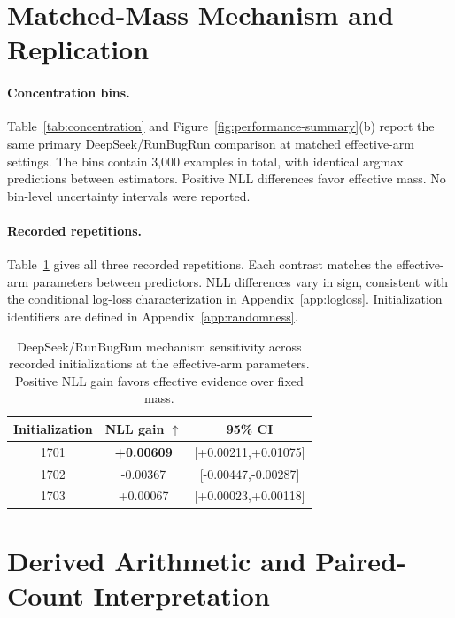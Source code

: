 \documentclass{article}
\begin{document}
\section{Matched-Mass Mechanism and Replication}
\label{app:mechanism-full}

\paragraph{Concentration bins.}
Table~\ref{tab:concentration} and Figure~\ref{fig:performance-summary}(b) report the same primary DeepSeek/RunBugRun comparison at matched effective-arm settings. The bins contain 3,000 examples in total, with identical argmax predictions between estimators. Positive NLL differences favor effective mass. No bin-level uncertainty intervals were reported.

\paragraph{Recorded repetitions.}
Table~\ref{tab:cross-seed-mechanism} gives all three recorded repetitions. Each contrast matches the effective-arm parameters between predictors. NLL differences vary in sign, consistent with the conditional log-loss characterization in Appendix~\ref{app:logloss}. Initialization identifiers are defined in Appendix~\ref{app:randomness}.

\begin{table}[htbp]
\centering
\small
\caption{DeepSeek/RunBugRun mechanism sensitivity across recorded initializations at the effective-arm parameters. Positive NLL gain favors effective evidence over fixed mass.}
\setlength{\tabcolsep}{7pt}
\begin{tabular}{ccc}
\toprule
Initialization & NLL gain $\uparrow$ & 95\% CI \\
\midrule
1701 & \textbf{+0.00609} & [+0.00211,+0.01075] \\
1702 & -0.00367 & [-0.00447,-0.00287] \\
1703 & +0.00067 & [+0.00023,+0.00118] \\
\bottomrule
\end{tabular}
\label{tab:cross-seed-mechanism}
\end{table}


\section{Derived Arithmetic and Paired-Count Interpretation}
\label{app:derived-summaries}
\end{document}
